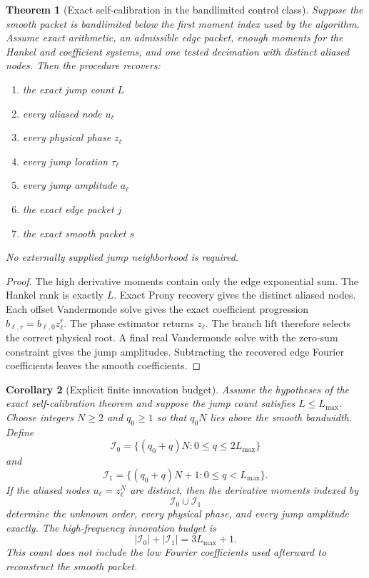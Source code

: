 \documentclass[11pt]{article}
\newtheorem{theorem}{Theorem}[section]
\newtheorem{corollary}[theorem]{Corollary}
\theoremstyle{remark}
\newcommand{\abs}[1]{\left|#1\right|}
\begin{document}
\begin{theorem}[Exact self-calibration in the bandlimited control class]
Suppose the smooth packet is bandlimited below the first moment index used by the algorithm. Assume exact arithmetic, an admissible edge packet, enough moments for the Hankel and coefficient systems, and one tested decimation with distinct aliased nodes. Then the procedure recovers:
\begin{enumerate}
\item the exact jump count $L$
\item every aliased node $u_\ell$
\item every physical phase $z_\ell$
\item every jump location $\tau_\ell$
\item every jump amplitude $a_\ell$
\item the exact edge packet $j$
\item the exact smooth packet $s$
\end{enumerate}
No externally supplied jump neighborhood is required.
\end{theorem}

\begin{proof}
The high derivative moments contain only the edge exponential sum. The Hankel rank is exactly $L$. Exact Prony recovery gives the distinct aliased nodes. Each offset Vandermonde solve gives the exact coefficient progression $b_{\ell,r}=b_{\ell,0}z_\ell^r$. The phase estimator returns $z_\ell$. The branch lift therefore selects the correct physical root. A final real Vandermonde solve with the zero-sum constraint gives the jump amplitudes. Subtracting the recovered edge Fourier coefficients leaves the smooth coefficients.
\end{proof}

\begin{corollary}[Explicit finite innovation budget]
Assume the hypotheses of the exact self-calibration theorem and suppose the jump count satisfies $L\le L_{\max}$. Choose integers $N\ge2$ and $q_0\ge1$ so that $q_0N$ lies above the smooth bandwidth. Define
\[
\mathcal I_0
=
\{(q_0+q)N:0\le q\le2L_{\max}\}
\]
and
\[
\mathcal I_1
=
\{(q_0+q)N+1:0\le q<L_{\max}\}.
\]
If the aliased nodes $u_\ell=z_\ell^N$ are distinct, then the derivative moments indexed by
\[
\mathcal I_0\cup\mathcal I_1
\]
determine the unknown order, every physical phase, and every jump amplitude exactly. The high-frequency innovation budget is
\[
\boxed{
\abs{\mathcal I_0}+\abs{\mathcal I_1}
=3L_{\max}+1.
}
\]
This count does not include the low Fourier coefficients used afterward to reconstruct the smooth packet.
\end{corollary}
\end{document}
